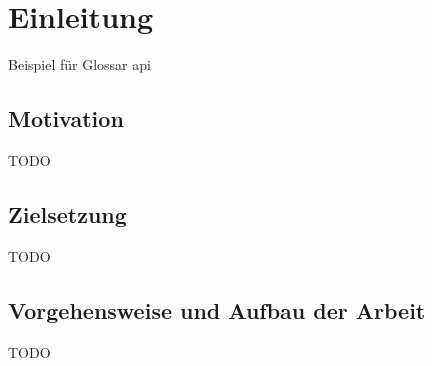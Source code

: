 \chapter{Einleitung}


Beispiel für Glossar \gls{api}

\section{Motivation}
TODO

\section{Zielsetzung}
TODO

\section{Vorgehensweise und Aufbau der Arbeit}
TODO